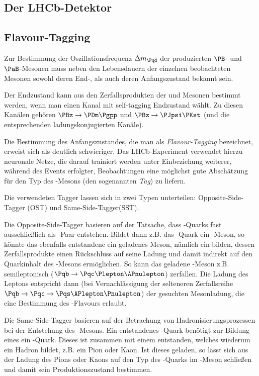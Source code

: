 \subsection{Der LHCb-Detektor}


\subsection{Flavour-Tagging}

Zur Bestimmung der Oszillationsfrequenz $\difference{m_{\Pqd}}$ der produzierten $\PB$- und $\PaB$-Mesonen muss neben den Lebensdauern der einzelnen beobachteten Mesonen sowohl deren End-, als auch deren Anfangszustand bekannt sein.

Der Endzustand kann aus den Zerfallsprodukten der \PBz und \PaBz Mesonen bestimmt werden, wenn man einen Kanal mit self-tagging Endzustand wählt.
Zu diesen Kanälen gehören $\PBz \to \PDm \Pgpp$ und $\PBz \to \PJpsi \PKst$ (und die entsprechenden ladungskonjugierten Kanäle).

Die Bestimmung des Anfangszustandes, die man als \emph{Flavour-Tagging} bezeichnet, erweist sich als deutlich schwieriger.
Das LHCb-Experiment verwendet hierzu neuronale Netze, die darauf trainiert werden unter Einbeziehung weiterer, während des Events erfolgter, Beobachtungen eine möglichst gute Abschätzung für den Typ des \PB-Mesons (den sogenannten \emph{Tag}) zu liefern. %

Die verwendeten Tagger lassen sich in zwei Typen unterteilen: Opposite-Side-Tagger (OST) und Same-Side-Tagger(SST).

Die Opposite-Side-Tagger basieren auf der Tatsache, dass \Pqb-Quarks fast ausschließlich als \Pqb\Paqb-Paar entstehen. Bildet dann z.B. das \Pqb-Quark ein \PaB-Meson, so könnte das ebenfalls entstandene \Paqb ein geladenes Meson, nämlich ein \PBp bilden, dessen Zerfallsprodukte einen Rückschluss auf seine Ladung und damit indirekt auf den Quarkinhalt des \PaB-Mesons ermöglichen.
So kann das geladene \PB-Meson z.B. semileptonisch ($\Pqb \to \Pqc \Plepton \APnulepton$) zerfallen. Die Ladung des Leptons entspricht dann (bei Vernachlässigung der selteneren Zerfallsreihe $\Pqb \to \Pqc \to \Pqs \APlepton \Pnulepton$) der gesuchten Mesonladung, die eine Bestimmung des \PB-Flavours erlaubt.\cite{ost}

Die Same-Side-Tagger basieren auf der Betrachung von Hadronisierungsprozessen bei der Entstehung des \PB-Mesons.
Ein entstandenes \Pqb-Quark benötigt zur Bildung eines \APB ein \APqd-Quark.
Dieses ist zusammen mit einem \Pqd entstanden, welches wiederum ein Hadron bildet, z.B. ein Pion oder Kaon.
Ist dieses geladen, so lässt sich aus der Ladung des Pions oder Kaons auf den Typ des \Pqd-Quarks im \PB-Meson schließen und damit sein Produktionszustand bestimmen.


